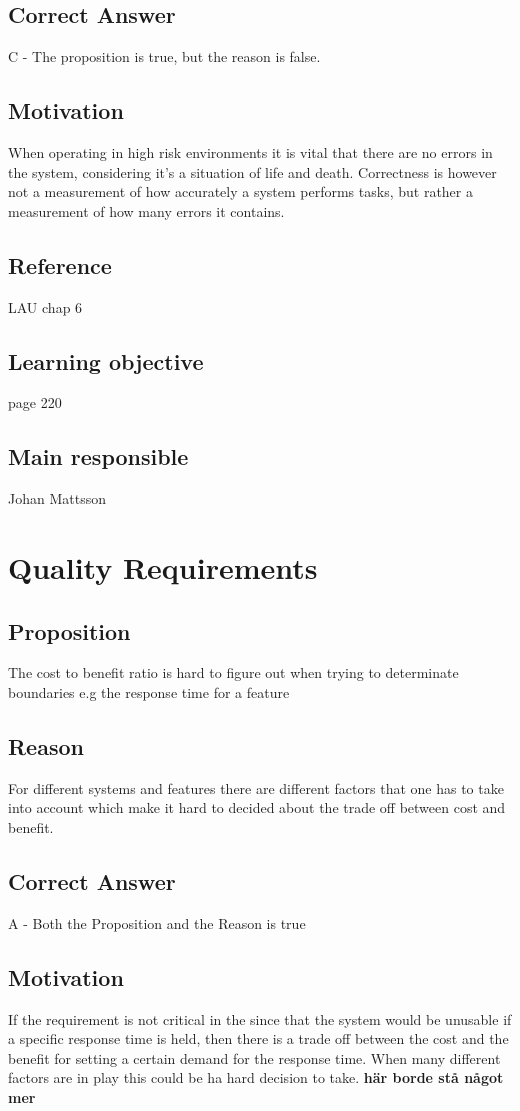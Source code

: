 \documentclass[a4paper]{article}
\begin{document}
\subsection*{Correct Answer}
C - The proposition is true, but the reason is false.
\subsection*{Motivation}
When operating in high risk environments it is vital that there are no errors in the system, considering it’s a situation of life and death. Correctness is however not a measurement of how accurately a system performs tasks, but rather a measurement of how many errors it contains.
\subsection*{Reference}
LAU chap 6
\subsection*{Learning objective}
page 220
\subsection*{Main responsible}
Johan Mattsson


\section{Quality Requirements}
\subsection*{Proposition}
The cost to benefit ratio is hard to figure out when trying to determinate boundaries e.g the response time for a feature
\subsection*{Reason}
For different systems and features there are different factors that one has to take into account which make it hard to decided about the trade off between cost and benefit.
\subsection*{Correct Answer}
A - Both the Proposition and the Reason is true
\subsection*{Motivation}
If the requirement is not critical in the since that the system would be unusable if a specific response time is held, then there is a trade off between the cost and the benefit for setting a certain demand for the response time. When many different factors are in play this could be ha hard decision to take. \textbf{här borde stå något mer}
\end{document}
